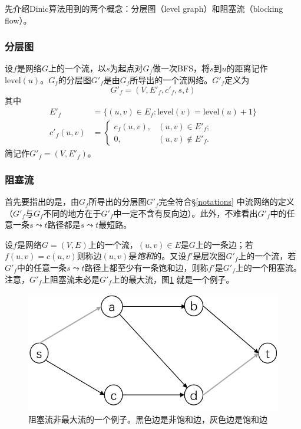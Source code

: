 \documentclass{ctexbook}
\begin{document}
    先介绍Dinic算法用到的两个概念：分层图（level graph）和阻塞流（blocking flow）。
    \subsubsection*{分层图}
    设$f$是网络$G$上的一个流，以$s$为起点对$G_f$做一次BFS，将$s$到$u$的距离记作$\mathrm{level}(u)$。$G_f$的分层图$G'_f$是由$G_f$所导出的一个流网络。$G'_f$定义为
    \[
    G'_f =(V, E'_f, c'_f, s, t)
    \]
    其中
    \begin{align*}
        E'_f &= \{(u,v)\in E_f\colon \mathrm{level}(v) = \mathrm{level}(u)+1\} \\
        c'_f(u,v) &=\begin{cases}
        c_f(u,v), & (u,v)\in E'_f;\\
        0, & (u,v)\notin E'_f.\end{cases}
    \end{align*}
    简记作$G'_f =(V, E'_f)$。
    \subsubsection{阻塞流}
    首先要指出的是，由$G_f$所导出的分层图$G'_f$完全符合\S\ref{notations} 中流网络的定义（$G'_f$与$G_f$不同的地方在于$G'_f$中一定不含有反向边）。此外，不难看出$G'_f$中的任意一条$s\leadsto t$路径都是$s\leadsto t$最短路。

    设$f$是网络$G=(V,E)$上的一个流，$(u,v)\in E$是$G$上的一条边；若$f(u,v) = c(u,v)$则称边$(u,v)$是\emph{饱和}的。又设$f'$是层次图$G'_f$上的一个流，若$G'_f$中的任意一条$s\leadsto t$路径上都至少有一条饱和边，则称$f'$是$G'_f$上的一个阻塞流。注意，$G'_f$上阻塞流未必是$G'_f$上的最大流，图\ref{Fig:blocking-flow} 就是一个例子。
    \begin{figure}
        \centering
        \includegraphics[scale=0.5]{figures/blocking-flow.png}
        \caption{阻塞流非最大流的一个例子。黑色边是非饱和边，灰色边是饱和边}
        \label{Fig:blocking-flow}
    \end{figure}
\end{document}
